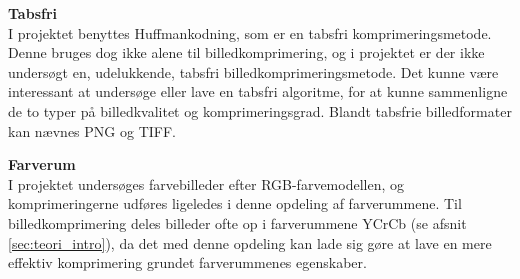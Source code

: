 \textbf{Tabsfri}\\
I projektet benyttes Huffmankodning, som er en tabsfri komprimeringsmetode. Denne bruges dog ikke alene til billedkomprimering, og i projektet er der ikke undersøgt en, udelukkende, tabsfri billedkomprimeringsmetode. Det kunne være interessant at undersøge eller lave en tabsfri algoritme, for at kunne sammenligne de to typer på billedkvalitet og komprimeringsgrad. Blandt tabsfrie billedformater kan nævnes PNG og TIFF.

\textbf{Farverum}\\
I projektet undersøges farvebilleder efter RGB-farvemodellen, og komprimeringerne udføres ligeledes i denne opdeling af farverummene. Til billedkomprimering deles billeder ofte op i farverummene YCrCb (se afsnit \vref{sec:teori_intro}), da det med denne opdeling kan lade sig gøre at lave en mere effektiv komprimering grundet farverummenes egenskaber.